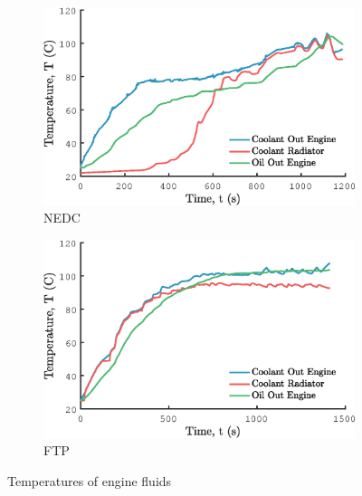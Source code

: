 \begin{figure}[ht]
  \centering
  \begin{subfigure}[b]{0.75\textwidth}
    \includegraphics[width=\textwidth]{figures/model/NEDC/Temp_engine.eps}
    \caption{NEDC}
    \label{fig:NEDC_Temp_engine}
  \end{subfigure}
  \begin{subfigure}[b]{0.75\textwidth}
    \includegraphics[width=\textwidth]{figures/model/FTP/Temp_engine.eps}
    \caption{FTP}
    \label{fig:FTP_Temp_engine}
  \end{subfigure}
  \caption{Temperatures of engine fluids}\label{fig:Temp_engine}
\end{figure}


